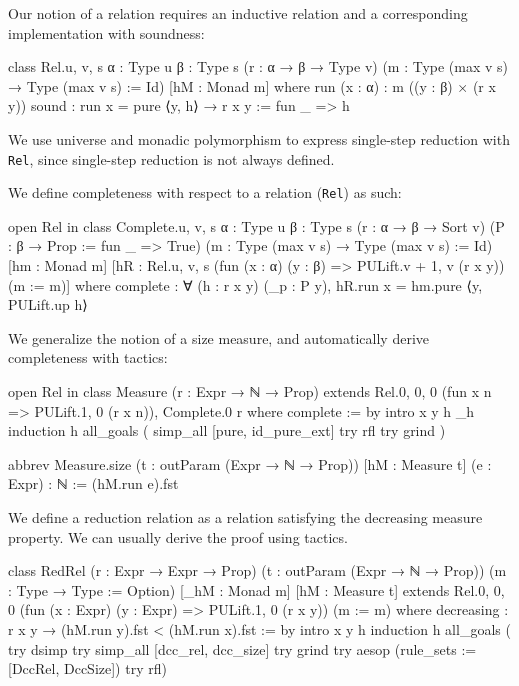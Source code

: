 \documentclass{article}
\begin{document}
Our notion of a relation requires an inductive relation and a corresponding implementation with soundness:

\begin{leancode}
class Rel.{u, v, s} {α : Type u} {β : Type s} (r : α → β → Type v)
  (m : Type (max v s) → Type (max v s) := Id) [hM : Monad m] where
  run (x : α) : m ((y : β) × (r x y))
  sound       : run x = pure ⟨y, h⟩ → r x y := fun _ => h
\end{leancode}

We use universe and monadic polymorphism to express single-step reduction with \texttt{Rel}, since single-step reduction is not always defined.

We define completeness with respect to a relation (\texttt{Rel}) as such:

\begin{leancode}
open Rel in class Complete.{u, v, s} {α : Type u} {β : Type s} (r : α → β → Sort v)
  (P : β → Prop := fun _ => True)
  (m : Type (max v s) → Type (max v s) := Id) [hm : Monad m]
  [hR : Rel.{u, v, s} (fun (x : α) (y : β) => PULift.{v + 1, v} (r x y)) (m := m)] where
  complete : ∀ (h : r x y) (_p : P y), hR.run x = hm.pure ⟨y, PULift.up h⟩
\end{leancode}

We generalize the notion of a size measure, and automatically derive completeness with tactics:

\begin{leancode}
open Rel in class Measure (r : Expr → ℕ → Prop)
  extends Rel.{0, 0, 0} (fun x n => PULift.{1, 0} (r x n)), Complete.{0} r where
  complete := by
    intro x y h _h
    induction h
    all_goals (
      simp_all [pure, id_pure_ext]
      try rfl
      try grind
    )

abbrev Measure.size (t : outParam (Expr → ℕ → Prop)) [hM : Measure t]
  (e : Expr) : ℕ := (hM.run e).fst
\end{leancode}

We define a reduction relation as a relation satisfying the decreasing measure property. We can usually derive the proof using tactics.

\begin{leancode}
class RedRel (r : Expr → Expr → Prop) (t : outParam (Expr → ℕ → Prop))
  (m : Type → Type := Option) [_hM : Monad m]
  [hM : Measure t] extends Rel.{0, 0, 0} (fun (x : Expr)
  (y : Expr) => PULift.{1, 0} (r x y)) (m := m) where
  decreasing : r x y → (hM.run y).fst < (hM.run x).fst := by
    intro x y h
    induction h
    all_goals (
      try dsimp
      try simp_all [dcc_rel, dcc_size]
      try grind
      try aesop (rule_sets := [DccRel, DccSize])
      try rfl)
\end{leancode}
\end{document}
